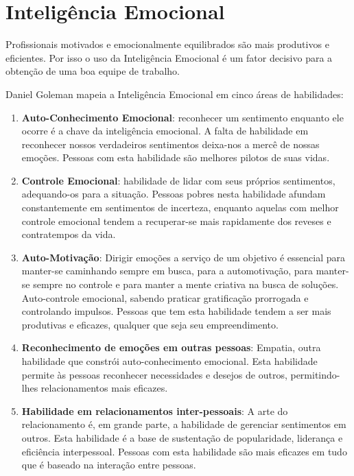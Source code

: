 \documentclass{article}
\begin{document}
\section{Inteligência Emocional}

Profissionais motivados e emocionalmente equilibrados são mais produtivos e
eficientes. Por isso o uso da Inteligência Emocional é um fator decisivo para
a obtenção de uma boa equipe de trabalho.

Daniel Goleman mapeia a Inteligência Emocional em cinco áreas de habilidades:

\begin{enumerate}
	\item \textbf{Auto-Conhecimento Emocional}: reconhecer um sentimento
	enquanto ele ocorre é a chave da inteligência emocional. A falta de
	habilidade em reconhecer nossos verdadeiros sentimentos deixa-nos a mercê
	de nossas emoções. Pessoas com esta habilidade são melhores pilotos de suas
	vidas.

	\item \textbf{Controle Emocional}: habilidade de lidar com seus próprios
	sentimentos, adequando-os para a situação. Pessoas pobres nesta habilidade
	afundam constantemente em sentimentos de incerteza, enquanto aquelas com
	melhor controle emocional tendem a recuperar-se mais rapidamente dos reveses
	e contratempos da vida.

	\item \textbf{Auto-Motivação}: Dirigir emoções a serviço de um objetivo é
	essencial para manter-se caminhando sempre em busca, para a automotivação,
	para manter-se sempre no controle e para manter a mente criativa na busca de
	soluções. Auto-controle emocional, sabendo praticar gratificação prorrogada
	e controlando impulsos. Pessoas que tem esta habilidade tendem a ser mais
	produtivas e eficazes, qualquer que seja seu empreendimento.

	\item \textbf{Reconhecimento de emoções em outras pessoas}: Empatia, outra
	habilidade que constrói auto-conhecimento emocional. Esta habilidade permite
	às pessoas reconhecer necessidades e desejos de outros, permitindo-lhes
	relacionamentos mais eficazes.

	\item \textbf{Habilidade em relacionamentos inter-pessoais}: A arte do
	relacionamento é, em grande parte, a habilidade de gerenciar sentimentos em
	outros. Esta habilidade é a base de sustentação de popularidade, liderança
	e eficiência interpessoal. Pessoas com esta habilidade são mais eficazes em
	tudo que é baseado na interação entre pessoas.
\end{enumerate}





\printindex
\end{document}
